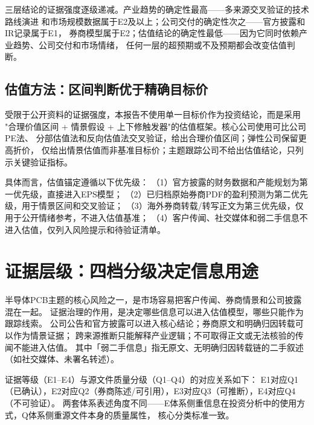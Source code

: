 三层结论的证据强度逐级递减。产业趋势的确定性最高——多来源交叉验证的技术路线演进
和市场规模数据属于E2及以上；公司交付的确定性次之——官方披露和IR记录属于E1，
券商模型属于E2；估值结论的确定性最低——因为它同时依赖产业趋势、公司交付和市场情绪，
任何一层的超预期或不及预期都会改变估值判断。

\subsection{估值方法：区间判断优于精确目标价}

受限于公开资料的证据强度，本报告不使用单一目标价作为投资结论，而是采用
"合理价值区间 + 情景假设 + 上下修触发器"的估值框架。核心公司使用可比公司PE法、
分部估值法和反向估值法交叉验证，给出合理价值区间；弹性公司保留更高折价，
仅给出情景估值而非基准目标价；主题跟踪公司不给出估值结论，只列示关键验证指标。

具体而言，估值锚定遵循以下优先级：
（1）官方披露的财务数据和产能规划为第一优先级，直接进入EPS模型；
（2）已归档原始券商PDF的盈利预测为第二优先级，用于情景区间和交叉验证；
（3）海外券商转载/转写正文为第三优先级，仅用于公开情绪参考，不进入估值基准；
（4）客户传闻、社交媒体和弱二手信息不进入估值，仅列入风险提示和待验证清单。

\section{证据层级：四档分级决定信息用途}

半导体PCB主题的核心风险之一，是市场容易把客户传闻、券商情景和公司披露混在一起。
证据治理的作用，是决定哪些信息可以进入估值模型，哪些只能作为跟踪线索。
公司公告和官方披露可以进入核心结论；券商原文和明确归因转载可以作为情景证据；
跨来源推断只能解释产业逻辑；不可取得正文或无法核验的传闻不能进入估值。
其中「弱二手信息」指无原文、无明确归因转载链的二手叙述（如社交媒体、未署名转述）。

证据等级（E1--E4）与源文件质量分级（Q1--Q4）的对应关系如下：
E1对应Q1（已确认），E2对应Q2（券商陈述/可引用），E3对应Q3（可推断），E4对应Q4（不可验证）。
两套体系表述角度不同——E体系侧重信息在投资分析中的使用方式，Q体系侧重源文件本身的质量属性，
核心分类标准一致。

